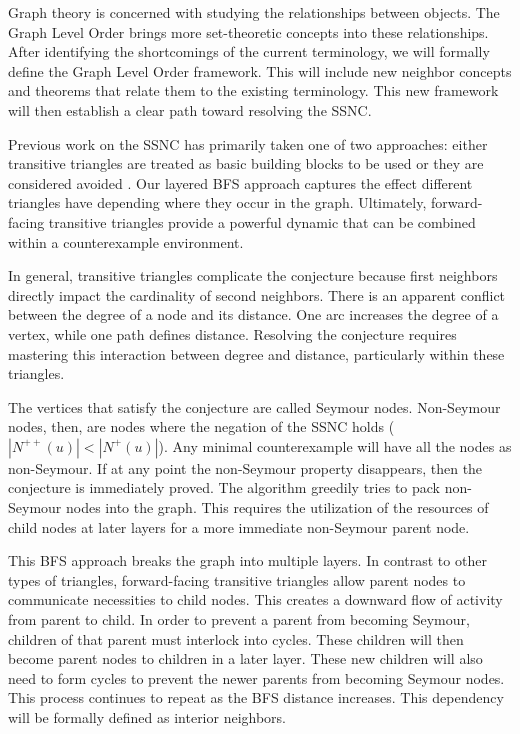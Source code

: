 \documentclass[AMS, Times1COL]{article} %
\theoremstyle{definition}
\begin{document}
	Graph theory is concerned with studying the relationships between objects. The Graph Level Order brings more set-theoretic concepts into these relationships. After identifying the shortcomings of the current terminology, we will formally define the Graph Level Order framework. This will include new neighbor concepts and theorems that relate them to the existing terminology. This new framework will then establish a clear path toward resolving the SSNC.	
	
	Previous work on the SSNC has primarily taken one of two approaches: either transitive triangles are treated as basic building blocks to be used \cite{FidlerYuster, MninyGhazal, Ghazal_2011, daamouch2024secondneighborhoodconjecturetournaments} or they are considered avoided \cite{Da, HKPS, BBKS}. Our layered BFS approach captures the effect different triangles have depending where they occur in the graph. Ultimately, forward-facing transitive triangles provide a powerful dynamic that can be combined within a counterexample environment.
	
	In general, transitive triangles complicate the conjecture because first neighbors directly impact the cardinality of second neighbors. There is an apparent conflict between the degree of a node and its distance. One arc increases the degree of a vertex, while one path defines distance. Resolving the conjecture requires mastering this interaction between degree and distance, particularly within these triangles.	
	
	The vertices that satisfy the conjecture are called Seymour nodes. Non-Seymour nodes, then, are nodes where the negation of the SSNC holds ($|N^{++}(u)| < |N^+(u)|$). Any minimal counterexample will have all the nodes as non-Seymour. If at any point the non-Seymour property disappears, then the conjecture is immediately proved. The algorithm greedily tries to pack non-Seymour nodes into the graph. This requires the utilization of the resources of child nodes at later layers for a more immediate non-Seymour parent node. 
	
	This BFS approach breaks the graph into multiple layers. In contrast to other types of triangles, forward-facing transitive triangles allow parent nodes to communicate necessities to child nodes. This creates a downward flow of activity from parent to child. In order to prevent a parent from becoming Seymour, children of that parent must interlock into cycles. These children will then become parent nodes to children in a later layer. These new children will also need to form cycles to prevent the newer parents from becoming Seymour nodes. This process continues to repeat as the BFS distance increases. This dependency will be formally defined as interior neighbors. 
	
\end{document}
